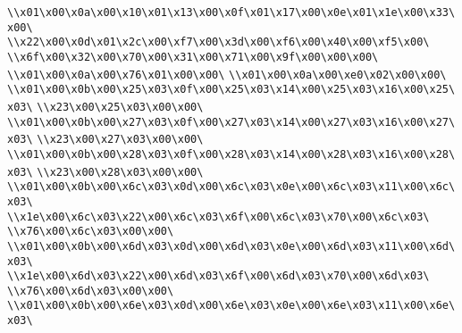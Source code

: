 \verb|\\x01\x00\x0a\x00\x10\x01\x13\x00\x0f\x01\x17\x00\x0e\x01\x1e\x00\x33\x00\|\newline
\verb|\\x22\x00\x0d\x01\x2c\x00\xf7\x00\x3d\x00\xf6\x00\x40\x00\xf5\x00\|\newline
\verb|\\x6f\x00\x32\x00\x70\x00\x31\x00\x71\x00\x9f\x00\x00\x00\|\newline
\verb|\\x01\x00\x0a\x00\x76\x01\x00\x00\|\newline
\verb|\\x01\x00\x0a\x00\xe0\x02\x00\x00\|\newline
\verb|\\x01\x00\x0b\x00\x25\x03\x0f\x00\x25\x03\x14\x00\x25\x03\x16\x00\x25\x03\|\newline
\verb|\\x23\x00\x25\x03\x00\x00\|\newline
\verb|\\x01\x00\x0b\x00\x27\x03\x0f\x00\x27\x03\x14\x00\x27\x03\x16\x00\x27\x03\|\newline
\verb|\\x23\x00\x27\x03\x00\x00\|\newline
\verb|\\x01\x00\x0b\x00\x28\x03\x0f\x00\x28\x03\x14\x00\x28\x03\x16\x00\x28\x03\|\newline
\verb|\\x23\x00\x28\x03\x00\x00\|\newline
\verb|\\x01\x00\x0b\x00\x6c\x03\x0d\x00\x6c\x03\x0e\x00\x6c\x03\x11\x00\x6c\x03\|\newline
\verb|\\x1e\x00\x6c\x03\x22\x00\x6c\x03\x6f\x00\x6c\x03\x70\x00\x6c\x03\|\newline
\verb|\\x76\x00\x6c\x03\x00\x00\|\newline
\verb|\\x01\x00\x0b\x00\x6d\x03\x0d\x00\x6d\x03\x0e\x00\x6d\x03\x11\x00\x6d\x03\|\newline
\verb|\\x1e\x00\x6d\x03\x22\x00\x6d\x03\x6f\x00\x6d\x03\x70\x00\x6d\x03\|\newline
\verb|\\x76\x00\x6d\x03\x00\x00\|\newline
\verb|\\x01\x00\x0b\x00\x6e\x03\x0d\x00\x6e\x03\x0e\x00\x6e\x03\x11\x00\x6e\x03\|\newline
